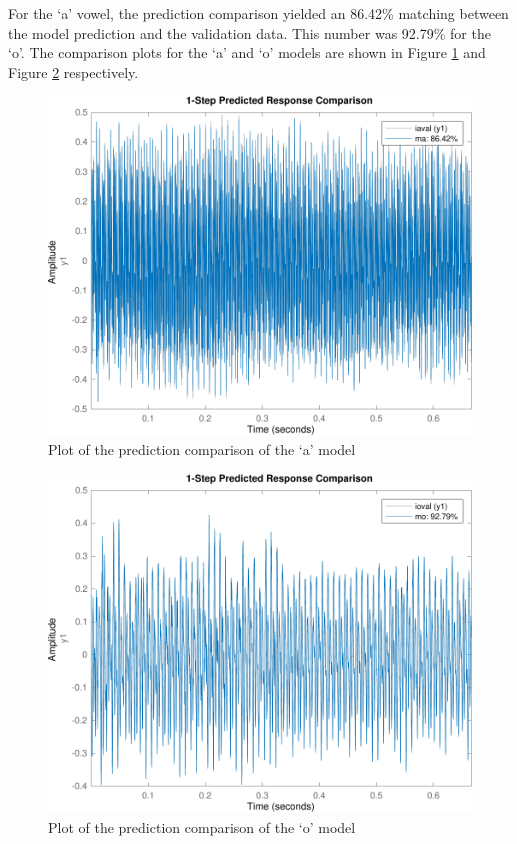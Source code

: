 \documentclass{IEEEtran}
\begin{document}
For the `a' vowel, the prediction comparison yielded an 86.42\% matching
between the model prediction and the validation data. This number was 92.79\%
for the `o'. The comparison plots for
the `a' and `o' models are shown in Figure \ref{fig:comparea} and Figure
\ref{fig:compareo} respectively.

\begin{figure}[h!]
    \centering
    \captionsetup{justification=centering}
    \includegraphics[width=0.8\columnwidth]{pictures/compare_a.pdf}
    \caption{Plot of the prediction comparison of the `a' model}
    \label{fig:comparea}
\end{figure}

\begin{figure}[h!]
    \centering
    \captionsetup{justification=centering}
    \includegraphics[width=0.8\columnwidth]{pictures/compare_o.pdf}
    \caption{Plot of the prediction comparison of the `o' model}
    \label{fig:compareo}
\end{figure}
\end{document}
